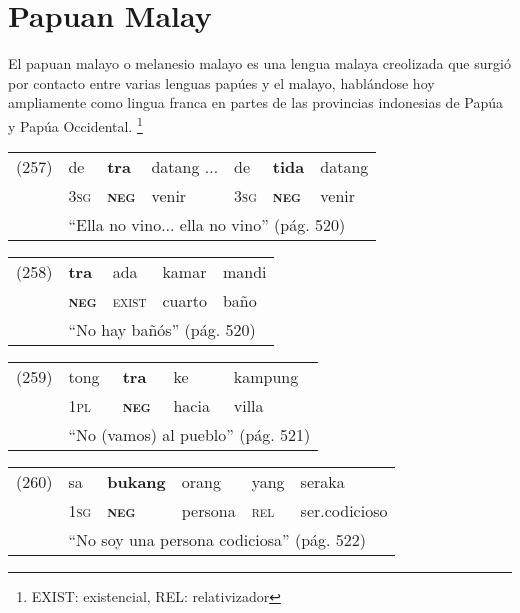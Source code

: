 \section*{Papuan Malay}

\noindent 
El papuan malayo o melanesio malayo es una lengua malaya creolizada que surgió por contacto entre varias lenguas papúes y el malayo, hablándose hoy ampliamente como lingua franca en partes de las provincias indonesias de Papúa y Papúa Occidental.
\footnote{EXIST: existencial, REL: relativizador}
\vspace{0.5cm}

{\setmainfont{Charis SIL} 

\noindent \begin{tabular}{lllllll}
(257) & de & \textbf{tra} & datang ... & de & \textbf{tida} & datang \\
& \textsc{3sg} & \textsc{\textbf{neg}} & venir & \textsc{3sg} & \textsc{\textbf{neg}} & venir \\
& \multicolumn{6}{l}{``Ella no vino... ella no vino'' (pág. 520)}
\end{tabular} \vspace{0.5cm}

\noindent \begin{tabular}{lllll}
(258) & \textbf{tra} & ada & kamar & mandi \\
& \textsc{\textbf{neg}} & \textsc{exist} & cuarto & baño \\
& \multicolumn{4}{l}{``No hay bañós'' (pág. 520)}
\end{tabular} \vspace{0.5cm}

\noindent \begin{tabular}{lllll}
(259) & tong & \textbf{tra} & ke & kampung \\
& \textsc{1pl} & \textsc{\textbf{neg}} & hacia & villa \\
& \multicolumn{4}{l}{``No (vamos) al pueblo'' (pág. 521)}
\end{tabular} \vspace{0.5cm}

\noindent \begin{tabular}{llllll}
(260) & sa & \textbf{bukang} & orang & yang & seraka \\
& \textsc{1sg} & \textsc{\textbf{neg}} & persona & \textsc{rel} & ser.codicioso \\
& \multicolumn{5}{l}{``No soy una persona codiciosa'' (pág. 522)}
\end{tabular} \vspace{0.5cm}

}
